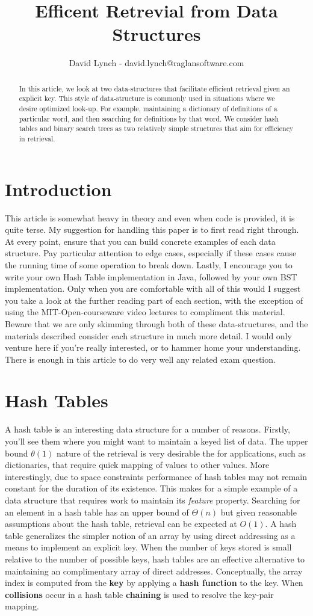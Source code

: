 \documentclass[10pt,a4paper]{article}
\title{Efficent Retrevial from Data Structures}
\author{David Lynch - david.lynch@raglansoftware.com }
\begin{document}
\maketitle
\begin{abstract}
In this article, we look at two data-structures that facilitate efficient retrieval given an explicit key. This style of data-structure is commonly used in situations where we desire optimized look-up. For example, maintaining a dictionary of definitions of a particular word, and then searching  for definitions by that word. We consider hash tables and binary search trees as two relatively simple structures that aim for efficiency in retrieval. 
\end{abstract}
\section{Introduction}
This article is somewhat heavy in theory and even when code is provided, it is quite terse. My suggestion for handling this paper is to first read right through. At every point, ensure that you can build concrete examples of each data structure. Pay particular attention to edge cases, especially if these cases cause the running time of some operation to break down. Lastly, I encourage you to write your own Hash Table implementation in Java, followed by your own BST implementation. Only when you are comfortable with all of this would I suggest you take a look at the further reading part of each section, with the exception of using the MIT-Open-courseware video lectures to compliment this material. Beware that we are only skimming through both of these data-structures, and the materials described consider each structure in much more detail. I would only venture here if you're really interested, or to hammer home your understanding. There is enough in this article to do very well any related exam question. 
\section{Hash Tables}
A hash table is an interesting data structure for a number of reasons. Firstly, you'll see them where you might want to maintain a keyed list of data. The upper bound $\theta(1)$ nature of the retrieval is very desirable the for applications, such as dictionaries, that require quick mapping of values to other values. More interestingly, due to space constraints performance of hash tables may not remain constant for the duration of its existence. This makes for a simple example of a data structure that requires work to maintain its {\it feature} property. Searching for an element in a hash table has an upper bound of $\Theta(n)$ but given reasonable assumptions about the hash table, retrieval can be expected at $O(1)$. A hash table generalizes the simpler notion of an array by using direct addressing as a means to implement an explicit key. When the number of keys stored is small relative to the number of possible keys, hash tables are an effective alternative to maintaining an complimentary array of direct addresses. Conceptually, the array index is computed from the {\bf key} by applying a {\bf hash function} to the key. When {\bf collisions} occur in a hash table {\bf chaining} is used to resolve the key-pair mapping. 
\end{document}
